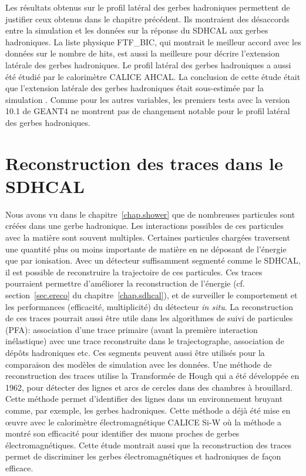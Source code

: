 Les résultats obtenus sur le profil latéral des gerbes hadroniques permettent de justifier ceux obtenus dans le chapitre précédent. Ils montraient des désaccords entre la simulation et les données sur la réponse du SDHCAL aux gerbes hadroniques. La liste physique FTF\_BIC, qui montrait le meilleur accord avec les données sur le nombre de hits, est aussi la meilleure pour décrire l'extension latérale des gerbes hadroniques. Le profil latéral des gerbes hadroniques a aussi été étudié par le calorimètre CALICE AHCAL. La conclusion de cette étude était que l'extension latérale des gerbes hadroniques était sous-estimée par la simulation \cite{geant4-ahcal}. Comme pour les autres variables, les premiers tests avec la version 10.1 de GEANT4 ne montrent pas de changement notable pour le profil latéral des gerbes hadroniques. 

\section{Reconstruction des traces dans le SDHCAL}
\label{sec.hough}
Nous avons vu dans le chapitre~\ref{chap.shower} que de nombreuses particules sont créées dans une gerbe hadronique. Les interactions possibles de ces particules avec la matière sont souvent multiples. Certaines particules chargées traversent une quantité plus ou moins importante de matière en ne déposant de l'énergie que par ionisation. Avec un détecteur suffisamment segmenté comme le SDHCAL, il est possible de reconstruire la trajectoire de ces particules. Ces traces pourraient permettre d'améliorer la reconstruction de l'énergie (cf. section~\ref{sec.ereco} du chapitre~\ref{chap.sdhcal}), et de surveiller le comportement et les performances (efficacité, multiplicité) du détecteur {\it{in situ}}. La reconstruction de ces traces pourrait aussi être utile dans les algorithmes de suivi de particules (PFA): association d'une trace primaire (avant la première interaction inélastique) avec une trace reconstruite dans le trajectographe, association de dépôts hadroniques etc. Ces segments peuvent aussi être utilisés pour la comparaison des modèles de simulation avec les données. Une méthode de reconstruction des traces utilise la Transformée de Hough \cite{houghPatent} qui a été développée en 1962, pour détecter des lignes et arcs de cercles dans des chambres à brouillard. Cette méthode permet d'identifier des lignes dans un environnement bruyant comme, par exemple, les gerbes hadroniques. Cette méthode a déjà été mise en œuvre avec le calorimètre électromagnétique CALICE Si-W \cite{can023} où la méthode a montré son efficacité pour identifier des muons proches de gerbes électromagnétiques. Cette étude montrait aussi que la reconstruction des traces permet de discriminer les gerbes électromagnétiques et hadroniques de façon efficace.
